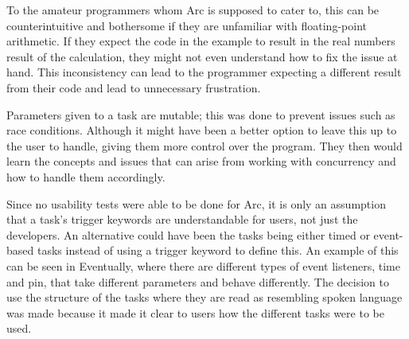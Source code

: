 To the amateur programmers whom Arc is supposed to cater to, this can be counterintuitive and bothersome if they are unfamiliar with floating-point arithmetic. If they expect the code in the example to result in the real numbers result of the calculation, they might not even understand how to fix the issue at hand. This inconsistency can lead to the programmer expecting a different result from their code and lead to unnecessary frustration.




Parameters given to a task are mutable; this was done to prevent issues such as race conditions. Although it might have been a better option to leave this up to the user to handle, giving them more control over the program. They then would learn the concepts and issues that can arise from working with concurrency and how to handle them accordingly.

Since no usability tests were able to be done for Arc, it is only an assumption that a task's trigger keywords are understandable for users, not just the developers. An alternative could have been the tasks being either timed or event-based tasks instead of using a trigger keyword to define this. An example of this can be seen in Eventually, where there are different types of event listeners, time and pin, that take different parameters and behave differently. The decision to use the structure of the tasks where they are read as resembling spoken language was made because it made it clear to users how the different tasks were to be used.





